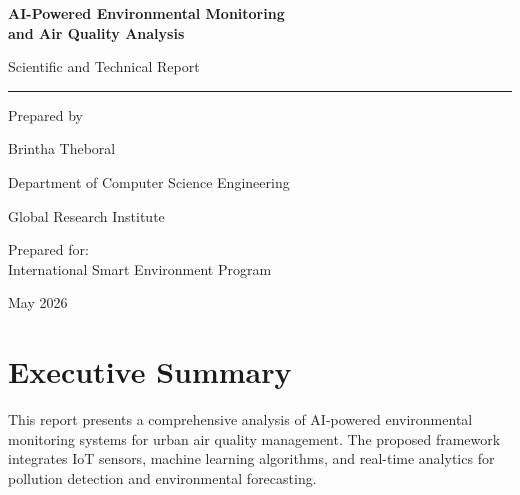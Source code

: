 \documentclass[12pt,a4paper]{article}
\begin{document}
	
	
	\begin{titlepage}
		
		\centering
		
		\vspace*{2cm}
		
		{\Huge\bfseries
			AI-Powered Environmental Monitoring\\
			and Air Quality Analysis
			\par}
		
		\vspace{1.5cm}
		
		{\Large
			Scientific and Technical Report
			\par}
		
		\vspace{2cm}
		
		\rule{6cm}{6cm}
		
		\vspace{2cm}
		
		{\Large
			Prepared by
			\par}
		
		\vspace{0.5cm}
		
		{\LARGE
			Brintha Theboral
			\par}
		
		\vspace{1cm}
		
		Department of Computer Science Engineering
		
		Global Research Institute
		
		\vfill
		
		Prepared for:\\
		International Smart Environment Program
		
		\vfill
		
		{\large May 2026}
		
	\end{titlepage}
	
	
	\section*{Executive Summary}
	
	This report presents a comprehensive analysis of AI-powered environmental monitoring systems for urban air quality management. The proposed framework integrates IoT sensors, machine learning algorithms, and real-time analytics for pollution detection and environmental forecasting.
	
\end{document}
